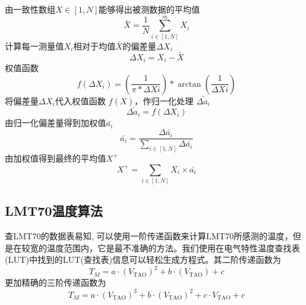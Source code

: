 \documentclass[scheme=chinese,a4paper]{article}
\begin{document}
 由一致性数组$X\in[1,N]$能够得出被测数据的平均值 
\begin{equation}
    \bar{X}=\frac{1}{N}\sum_{i\in[1,N]}^mX_i
\end{equation}
计算每一测量值$X_i$相对于均值$\bar{X}$的偏差量$\Delta X_i$
\begin{equation}
    \Delta X_i=X_i-\bar{X}
\end{equation}
权值函数
\begin{equation}
    f(\Delta X_i)=(\frac{1}{\pi*\Delta Xi})*\arctan(\frac{1}{\Delta Xi})  
\end{equation}
 将偏差量$\Delta X_i$代入权值函数 $f(X)$，作归一化处理 $\bar{\Delta a_i}$
\begin{equation}
    \bar{\Delta a_i}=f(\Delta X_i)
\end{equation}
由归一化偏差量得到加权值$\bar{a_i}$
\begin{equation}
    \bar{a_i}=\frac{\Delta \bar{a_i}}{\sum_{i\in[1,N]} \Delta \bar{a_i}}
\end{equation}
由加权值得到最终的平均值$X^+$
\begin{equation}
    X^+=\sum_{i\in[1,N]}X_i\times\bar{a_i}
\end{equation}
\subsection{LMT70温度算法}
查LMT70的数据表易知, 可以使用一阶传递函数来计算LMT70所感测的温度，但是在较宽的温度范围内，它是最不准确的方法。我们使用在电气特性温度查找表(LUT)中找到的LUT(查找表)信息可以轻松生成方程式。其二阶传递函数为
\begin{equation}
  T_M=a\cdot(V_{\text{TAO}})^2+b\cdot(V_{\text{TAO}})+c
\end{equation}
更加精确的三阶传递函数为
\begin{equation}
  T_M=a\cdot(V_{\text{TAO}})^3+b\cdot(V_{\text{TAO}})^2+c\cdot V_{\text{TAO}}+c
\end{equation}
\end{document}
